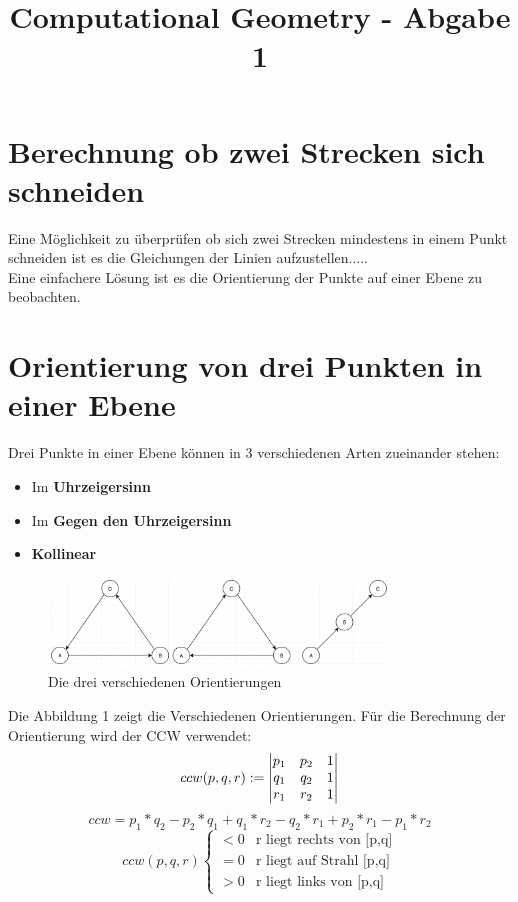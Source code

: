 \documentclass[conference]{IEEEtran}
\begin{document}
\title{Computational Geometry - Abgabe 1}

\author{
}

\maketitle

\begin{abstract}

	
\end{abstract}

\section{Berechnung ob zwei Strecken sich schneiden}
Eine Möglichkeit zu überprüfen ob sich zwei Strecken mindestens in einem Punkt schneiden ist es die Gleichungen der Linien aufzustellen.....\\
Eine einfachere Lösung ist es die Orientierung der Punkte auf einer Ebene zu beobachten.

\section{Orientierung von drei Punkten in einer Ebene}
Drei Punkte in einer Ebene können in 3 verschiedenen Arten zueinander stehen:
\begin{itemize}
	\item Im \textbf{Uhrzeigersinn}
	\item Im \textbf{Gegen den Uhrzeigersinn}
	\item \textbf{Kollinear}
\end{itemize}
\begin{figure}[h]
	\begin{center}
		\includegraphics[width=9cm]{Orientation.png}
		\caption{Die drei verschiedenen Orientierungen}
		\label{figure_3}
	\end{center}
\end{figure}
Die Abbildung 1 zeigt die Verschiedenen Orientierungen. Für die Berechnung der Orientierung wird der CCW verwendet:
\[ 
ccw(p,q,r) := 
\begin{vmatrix}
	p_1 & p_2 & 1 \\ 
	q_1 & q_2 & 1 \\ 
	r_1 & r_2 & 1 \notag
\end{vmatrix} \]
\[ ccw = p_1*q_2 - p_2*q_1 + q_1*r_2 - q_2*r_1 + p_2*r_1 - p_1*r_2\]
\[ ccw(p,q,r) \begin{cases} < 0 &\text{r liegt rechts von [p,q]}\\ = 0 &\text{r liegt auf Strahl [p,q]}\\ > 0 &\text{r liegt links von [p,q]}\end{cases} \]
\end{document}
